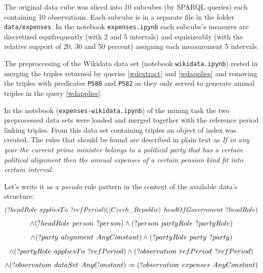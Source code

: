 The original data cube was sliced into 10 subcubes (by SPARQL queries) each containing 10 observations. Each subcube is in a separate file in the folder \verb|data/expenses|. In the notebook \verb|expenses.ipynb| each subcube's measures are discretized equifrequently (with 2 and 5 intervals) and equisizeably (with the relative support of 20, 30 and 50 percent) assigning each measurement 5 intervals.

The preproccesing of the Wikidata data set (notebook \verb|wikidata.ipynb|) rested in merging the triples returned by queries \ref{wdextract} and \ref{wdapplies} and removing the triples with predicates \verb|P580| and \verb|P582| as they only served to generate annual triples in the query \ref{wdapplies}.

In the notebook (\verb|expenses-wikidata.ipynb|) of the mining task the two preprocessed data sets were loaded and merged together with the reference period linking triples. From this data set containing  triples an object of index was created. The rules that should be found are described in plain text as \textit{If in any year the current prime minister belongs to a political party that has a certain political alignment then the annual expenses of a certain pension kind fit into certain interval}. 

Let's write it as a \textit{pseudo} rule pattern in the context of the available data's structure:
$$
(?headRole\hspace{0.4em}appliesTo\hspace{0.4em}?refPeriod) (\langle Czech\_Republic\rangle\hspace{0.4em}headOfGovernment\hspace{0.4em}?headRole) 
$$
$$
\land (?headRole\hspace{0.4em}person\hspace{0.4em}?person) \land (?person\hspace{0.4em}partyRole\hspace{0.4em}?partyRole) 
$$
$$
\land (?party\hspace{0.4em}alignment\hspace{0.4em}AnyConstant) \land (?partyRole\hspace{0.4em}party\hspace{0.4em}?party) 
$$
$$
\land (?partyRole\hspace{0.4em}appliesTo\hspace{0.4em}?refPeriod) \land (?observation\hspace{0.4em}refPeriod\hspace{0.4em}?refPeriod)
$$
$$
\land (?observation\hspace{0.4em}dataSet\hspace{0.4em}AnyConstant) \Rightarrow (?observation\hspace{0.4em}expenses\hspace{0.4em}AnyConstant)
$$

